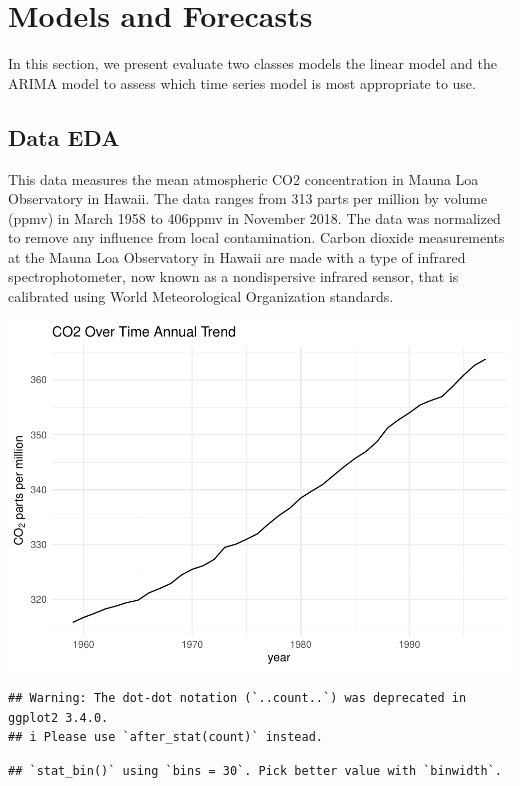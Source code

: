 \documentclass[AER]{AEA}
\begin{document}
\hypertarget{models-and-forecasts}{%
\section{Models and Forecasts}\label{models-and-forecasts}}

In this section, we present evaluate two classes models the linear model
and the ARIMA model to assess which time series model is most
appropriate to use.

\hypertarget{data-eda}{%
\subsection{Data EDA}\label{data-eda}}

This data measures the mean atmospheric CO2 concentration in Mauna Loa
Observatory in Hawaii. The data ranges from 313 parts per million by
volume (ppmv) in March 1958 to 406ppmv in November 2018. The data was
normalized to remove any influence from local contamination. Carbon
dioxide measurements at the Mauna Loa Observatory in Hawaii are made
with a type of infrared spectrophotometer, now known as a nondispersive
infrared sensor, that is calibrated using World Meteorological
Organization standards.

\includegraphics{Lab2_Group_report_files/figure-latex/unnamed-chunk-3-1.pdf}

\begin{verbatim}
## Warning: The dot-dot notation (`..count..`) was deprecated in ggplot2 3.4.0.
## i Please use `after_stat(count)` instead.
\end{verbatim}

\begin{verbatim}
## `stat_bin()` using `bins = 30`. Pick better value with `binwidth`.
\end{verbatim}
\end{document}
